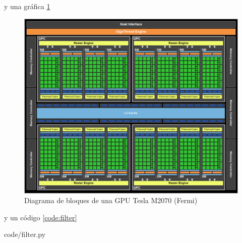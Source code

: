 \documentclass[twoside]{article}
\begin{document}
y una gráfica \ref{fig:Fermi}

\begin{figure}
	\includegraphics[width=.45\textwidth]{block_diagram_Fermi}
	\caption{\label{fig:Fermi} Diagrama de bloques de una GPU Tesla M2070 (Fermi)}
\end{figure}

y un código \ref{code:filter}

%
   {code/filter.py}



\end{document}
